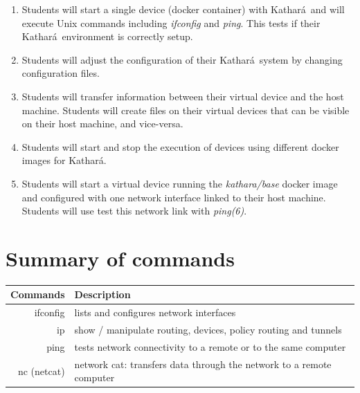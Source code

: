 \documentclass[12pt]{book}
\newcommand{\kathara}{Kathar\'a}
\begin{document}
\begin{enumerate}[label=\arabic*.]
\begin{enumerate}[label=Objective \arabic*]
  \item\label{vstart} Students will start a single device (docker container) with \kathara\ and will execute Unix commands including \emph{ifconfig} and \emph{ping}. This tests if their \kathara\ environment is correctly setup.
  \item\label{config} Students will adjust the configuration of their \kathara\ system by changing configuration files.
  \item\label{hosthome} Students will transfer information between their virtual device and the host machine. Students will create files on their virtual devices that can be visible on their host machine, and vice-versa.
  \item\label{image} Students will start and stop the execution of devices using different docker images for \kathara.
    \item\label{bridged} Students will start a virtual device running the \emph{kathara/base} docker image and configured with one network interface linked to their host machine. Students will use test this network link with \emph{ping(6)}. 
\end{enumerate}


\section{Summary of commands}

\begin{tabularx}{\textwidth}{r  X}
  Commands & Description \\ \midrule
  ifconfig & lists and configures network interfaces \\
  ip & show / manipulate routing, devices, policy routing and tunnels \\
  ping & tests network connectivity to a remote or to the same computer \\
  nc (netcat) & network cat: transfers data through the network to a remote computer \\ \midrule


\end{tabularx}
\end{enumerate}
\end{document}
